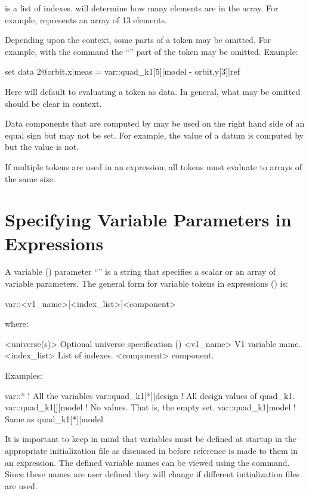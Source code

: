  is a list of indexes.  will determine how many elements are in
the array. For example,  represents an array of 13 elements.

Depending upon the context, some parts of a token may be omitted. For example, with the  command the ``'' part of the token may be omitted.  Example:
\begin{example}
  set data 2@orbit.x|meas = var::quad_k1[5]|model - orbit.y[3]|ref
\end{example}
Here \tao will default to evaluating a token as data. In general, what may be omitted
should be clear in context.

Data components that are computed by \tao may be used on the right hand side of an equal sign but
may not be set. For example, the  value of a datum is computed by \tao but the 
value is not.

If multiple tokens are used in an expression, all tokens must evaluate to arrays of the same size.

\section{Specifying Variable Parameters in Expressions}
\label{s:var.token}

A variable () parameter ``'' is a string that specifies a scalar or an array
of variable parameters. The general form for variable tokens in expressions
() is:
\begin{example}
  var::<v1_name>[<index_list>]<component>
\end{example}
where:
\begin{example}
  <universe(s)>       Optional universe specification ()
  <v1_name>           V1 variable name.
  <index_list>        List of indexes.
  <component>         component. 
\end{example}
Examples:
\begin{example}
  var::*                     ! All the variables
  var::quad_k1[*]|design     ! All design values of quad_k1.
  var::quad_k1[]|model       ! No values. That is, the empty set.
  var::quad_k1|model         ! Same as quad_k1[*]|model
\end{example}

It is important to keep in mind that variables must be defined at startup in the appropriate
initialization file as discussed in  before reference is made to them in an
expression.  The defined  variable names can be viewed using the 
command. Since these names are user defined they will change if different initialization files are
used.

